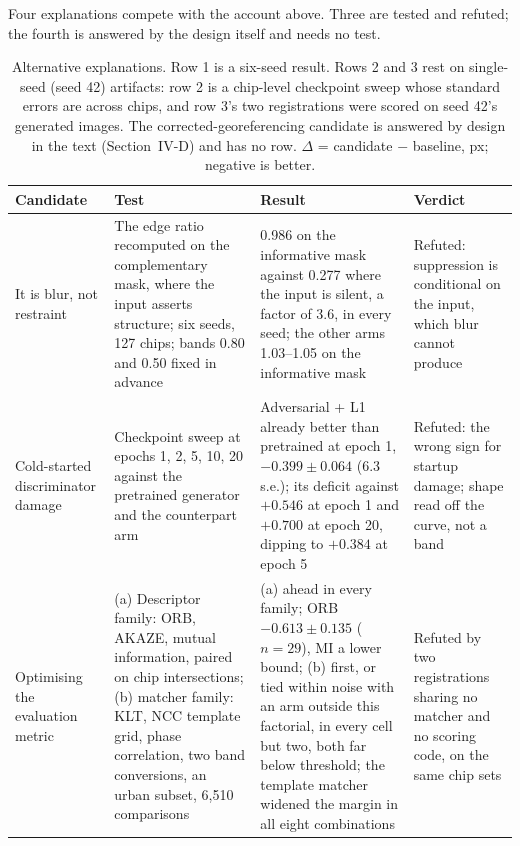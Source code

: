 Four explanations compete with the account above. Three are tested and refuted; the
fourth is answered by the design itself and needs no test.

\begin{table}[t]
\caption{Alternative explanations. Row 1 is a six-seed result. Rows 2 and 3 rest on single-seed (seed 42) artifacts:
row 2 is a chip-level checkpoint sweep whose standard errors are across chips, and row 3's
two registrations were scored on seed 42's generated images. The corrected-georeferencing candidate is answered by design in the text
(Section~IV-D) and has no row. $\Delta$ = candidate $-$ baseline, px; negative is better.}
\label{tab:alt}
\centering
\small
\begin{tabular}{@{}p{2.6cm}p{4.6cm}p{6.2cm}p{2.9cm}@{}}
\toprule
Candidate & Test & Result & Verdict \\
\midrule
It is blur, not restraint &
The edge ratio recomputed on the complementary mask, where the input asserts structure;
six seeds, 127 chips; bands 0.80 and 0.50 fixed in advance &
\Lone{} 0.986 on the informative mask against 0.277 where the input is silent, a factor
of 3.6, in every seed; the other arms 1.03--1.05 on the informative mask &
Refuted: suppression is conditional on the input, which blur cannot produce \\
\addlinespace
Cold-started discriminator damage &
Checkpoint sweep at epochs 1, 2, 5, 10, 20 against the pretrained generator and the
counterpart arm &
Adversarial + L1 already better than pretrained at epoch 1, $-0.399 \pm 0.064$ (6.3
s.e.); its deficit against \Lone{} $+0.546$ at epoch 1 and $+0.700$ at epoch 20, dipping
to $+0.384$ at epoch 5 &
Refuted: the wrong sign for startup damage; shape read off the curve, not a band \\
\addlinespace
Optimising the evaluation metric &
(a) Descriptor family: ORB, AKAZE, mutual information, paired on chip intersections;
(b) matcher family: KLT, NCC template grid, phase correlation, two band conversions, an
urban subset, 6,510 comparisons &
(a) \Lone{} ahead in every family; ORB $-0.613 \pm 0.135$ ($n = 29$), MI a lower bound;
(b) \Lone{} first, or tied within noise with an arm outside this factorial, in every cell
but two, both far below threshold; the template matcher widened the margin in all eight
combinations &
Refuted by two registrations sharing no matcher and no scoring code, on the same chip sets \\
\bottomrule
\end{tabular}
\end{table}

